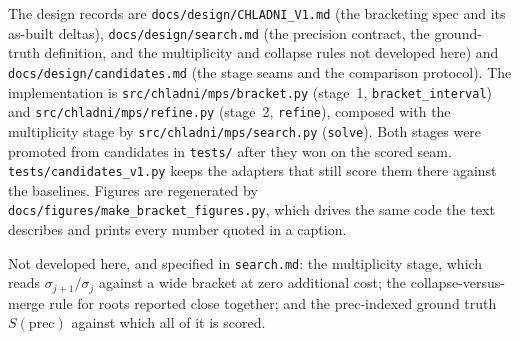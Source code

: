 \documentclass[11pt]{article}
\theoremstyle{definition}
\theoremstyle{remark}
\newcommand{\code}[1]{\texttt{#1}}
\newcommand{\sig}{\sigma}
\newcommand{\pr}{\mathrm{prec}}
\begin{document}
The design records are \code{docs/design/CHLADNI\_V1.md} (the bracketing spec and its as-built
deltas), \code{docs/design/search.md} (the precision contract, the ground-truth definition, and
the multiplicity and collapse rules not developed here) and \code{docs/design/candidates.md}
(the stage seams and the comparison protocol). The implementation is
\code{src/chladni/mps/bracket.py} (stage~1, \code{bracket\_interval}) and
\code{src/chladni/mps/refine.py} (stage~2, \code{refine}), composed with the multiplicity stage
by \code{src/chladni/mps/search.py} (\code{solve}). Both stages were promoted from candidates in
\code{tests/} after they won on the scored seam. \code{tests/candidates\_v1.py} keeps the
adapters that still score them there against the baselines. Figures are regenerated by
\code{docs/figures/make\_bracket\_figures.py}, which drives the same code the text describes and
prints every number quoted in a caption.

Not developed here, and specified in \code{search.md}: the multiplicity stage, which reads
$\sig_{j+1}/\sig_j$ against a wide bracket at zero additional cost; the collapse-versus-merge
rule for roots reported close together; and the $\pr$-indexed ground truth $S(\pr)$ against
which all of it is scored.
\end{document}
